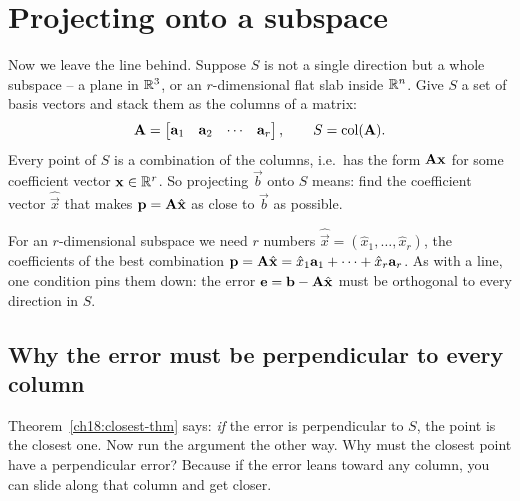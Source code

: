 \section{Projecting onto a subspace}

Now we leave the line behind. Suppose $S$ is not a single direction but a whole subspace -- a plane
in $\mathbb{R}^3$, or an $r$-dimensional flat slab inside $\mathbb{R}^n$. Give $S$ a set of basis vectors and stack
them as the columns of a matrix:
\[
  \mathbf{A} = \begin{bmatrix} \mathbf{a}_1 & \mathbf{a}_2 & \cdots & \mathbf{a}_r \end{bmatrix},
  \qquad
  S = \operatorname{col}(\mathbf{A}).
\]
Every point of $S$ is a combination of the columns, i.e.\ has the form $\mathbf{A}\mathbf{x}$ for some
coefficient vector $\mathbf{x}\in\mathbb{R}^r$. So projecting $\vec{b}$ onto $S$ means: find the coefficient
vector $\hat{\vec{x}}$ that makes $\mathbf{p}=\mathbf{A}\hat{\mathbf{x}}$ as close to $\vec{b}$ as possible.

\begin{intuitionbox}
For an $r$-dimensional subspace we need $r$ numbers
$\hat{\vec{x}} = (\hat{x}_1,\dots,\hat{x}_r)$, the coefficients of the best
combination $\mathbf{p} = \mathbf{A}\hat{\mathbf{x}} = \hat{x}_1\mathbf{a}_1+\dots+\hat{x}_r\mathbf{a}_r$.
As with a line, one condition pins them down: the error
$\mathbf{e} = \mathbf{b} - \mathbf{A}\hat{\mathbf{x}}$ must be orthogonal to every direction in $S$.
\end{intuitionbox}

\subsection{Why the error must be perpendicular to every column}

Theorem~\ref{ch18:closest-thm} says: \emph{if} the error is perpendicular to $S$, the point is the
closest one. Now run the argument the other way. Why must the closest point have a perpendicular
error? Because if the error leans toward any column, you can slide along that column and get
closer.

